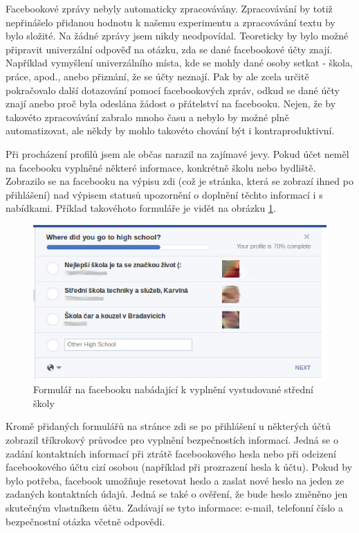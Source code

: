 \documentclass[thesis=M,czech]{FITthesis}[2013/05/10]
\begin{document}
Facebookové zprávy nebyly automaticky zpracovávány. Zpracovávání by totiž nepřinášelo přidanou hodnotu k našemu experimentu a zpracovávání textu by bylo složité. Na žádné zprávy jsem nikdy neodpovídal. Teoreticky by bylo možné připravit univerzální odpověď na otázku, zda se dané facebookové účty znají. Například vymyšlení univerzálního místa, kde se mohly dané osoby setkat - škola, práce, apod., anebo přiznání, že se účty neznají. Pak by ale zcela určitě pokračovalo další dotazování pomocí facebookových zpráv, odkud se dané účty znají anebo proč byla odeslána žádost o přátelství na facebooku. Nejen, že by takovéto zpracovávání zabralo mnoho času a nebylo by možné plně automatizovat, ale někdy by mohlo takovéto chování být i kontraproduktivní.

Při procházení profilů jsem ale občas narazil na zajímavé jevy. Pokud účet neměl na facebooku vyplněné některé informace, konkrétně školu nebo bydliště. Zobrazilo se na facebooku na výpisu zdi (což je stránka, která se zobrazí ihned po přihlášení) nad výpisem statusů upozornění o doplnění těchto informací i s nabídkami. Příklad takovéhoto formuláře je vidět na obrázku \ref{fig:completeSchool}.

\begin{figure}[h]
\begin{center}
\includegraphics[width=5in]{figures/completeSchool.png}
\caption{Formulář na facebooku nabádající k vyplnění vystudované střední školy}
\label{fig:completeSchool}
\end{center}
\end{figure}

Kromě přidaných formulářů na stránce zdi se po přihlášení u některých účtů zobrazil tříkrokový průvodce pro vyplnění bezpečnostích informací. Jedná se o zadání kontaktních informací při ztrátě facebookového hesla nebo při odcizení facebookového účtu cizí osobou (například při prozrazení hesla k účtu). Pokud by bylo potřeba, facebook umožňuje resetovat heslo a zaslat nové heslo na jeden ze zadaných kontaktních údajů. Jedná se také o ověření, že bude heslo změněno jen skutečným vlastníkem účtu. Zadávají se tyto informace: e-mail, telefonní číslo a bezpečnostní otázka včetně odpovědi. 
\end{document}
